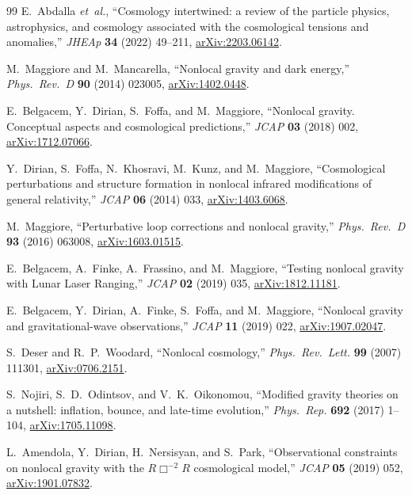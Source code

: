 \documentclass[11pt,a4paper]{article}
\theoremstyle{plain}
\theoremstyle{definition}
\theoremstyle{remark}
\begin{document}
\begin{thebibliography}{99}
E.~Abdalla \textit{et~al.},
``Cosmology intertwined: a review of the particle physics,
astrophysics, and cosmology associated with the cosmological tensions
and anomalies,''
\emph{JHEAp} \textbf{34} (2022) 49--211,
\href{https://arxiv.org/abs/2203.06142}{arXiv:2203.06142}.

M.~Maggiore and M.~Mancarella,
``Nonlocal gravity and dark energy,''
\emph{Phys.\ Rev.\ D} \textbf{90} (2014) 023005,
\href{https://arxiv.org/abs/1402.0448}{arXiv:1402.0448}.

E.~Belgacem, Y.~Dirian, S.~Foffa, and M.~Maggiore,
``Nonlocal gravity. Conceptual aspects and cosmological predictions,''
\emph{JCAP} \textbf{03} (2018) 002,
\href{https://arxiv.org/abs/1712.07066}{arXiv:1712.07066}.

Y.~Dirian, S.~Foffa, N.~Khosravi, M.~Kunz, and M.~Maggiore,
``Cosmological perturbations and structure formation in nonlocal
infrared modifications of general relativity,''
\emph{JCAP} \textbf{06} (2014) 033,
\href{https://arxiv.org/abs/1403.6068}{arXiv:1403.6068}.

M.~Maggiore,
``Perturbative loop corrections and nonlocal gravity,''
\emph{Phys.\ Rev.\ D} \textbf{93} (2016) 063008,
\href{https://arxiv.org/abs/1603.01515}{arXiv:1603.01515}.

E.~Belgacem, A.~Finke, A.~Frassino, and M.~Maggiore,
``Testing nonlocal gravity with Lunar Laser Ranging,''
\emph{JCAP} \textbf{02} (2019) 035,
\href{https://arxiv.org/abs/1812.11181}{arXiv:1812.11181}.

E.~Belgacem, Y.~Dirian, A.~Finke, S.~Foffa, and M.~Maggiore,
``Nonlocal gravity and gravitational-wave observations,''
\emph{JCAP} \textbf{11} (2019) 022,
\href{https://arxiv.org/abs/1907.02047}{arXiv:1907.02047}.

S.~Deser and R.~P.~Woodard,
``Nonlocal cosmology,''
\emph{Phys.\ Rev.\ Lett.} \textbf{99} (2007) 111301,
\href{https://arxiv.org/abs/0706.2151}{arXiv:0706.2151}.

S.~Nojiri, S.~D.~Odintsov, and V.~K.~Oikonomou,
``Modified gravity theories on a nutshell: inflation, bounce, and
late-time evolution,''
\emph{Phys.\ Rep.} \textbf{692} (2017) 1--104,
\href{https://arxiv.org/abs/1705.11098}{arXiv:1705.11098}.

L.~Amendola, Y.~Dirian, H.~Nersisyan, and S.~Park,
``Observational constraints on nonlocal gravity with the $R\Box^{-2}R$
cosmological model,''
\emph{JCAP} \textbf{05} (2019) 052,
\href{https://arxiv.org/abs/1901.07832}{arXiv:1901.07832}.


\end{thebibliography}
\end{document}
